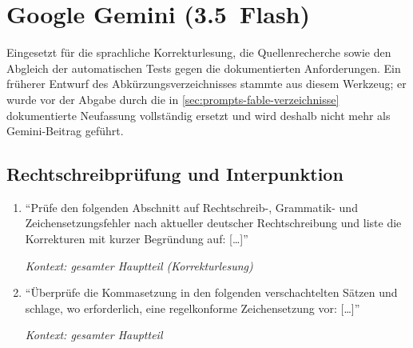 
\section{Google Gemini (3.5~Flash)}
\label{sec:prompts-gemini}

\nocite{geminiFlash2026}

Eingesetzt für die sprachliche Korrekturlesung, die Quellenrecherche sowie
den Abgleich der automatischen Tests gegen die dokumentierten Anforderungen.
Ein früherer Entwurf des Abkürzungsverzeichnisses stammte aus diesem Werkzeug;
er wurde vor der Abgabe durch die in \cref{sec:prompts-fable-verzeichnisse}
dokumentierte Neufassung vollständig ersetzt und wird deshalb nicht mehr als
Gemini-Beitrag geführt.

\subsection{Rechtschreibprüfung und Interpunktion}
\label{sec:prompts-gemini-sprache}
\begin{enumerate}
    \item \enquote{Prüfe den folgenden Abschnitt auf Rechtschreib-,
            Grammatik- und Zeichensetzungsfehler nach aktueller deutscher
            Rechtschreibung und liste die Korrekturen mit kurzer Begründung
            auf: [\dots]}
            \par\hfill\textit{Kontext: gesamter Hauptteil (Korrekturlesung)}

    \item \enquote{Überprüfe die Kommasetzung in den folgenden
            verschachtelten Sätzen und schlage, wo erforderlich, eine
            regelkonforme Zeichensetzung vor: [\dots]}
            \par\hfill\textit{Kontext: gesamter Hauptteil}
\end{enumerate}

